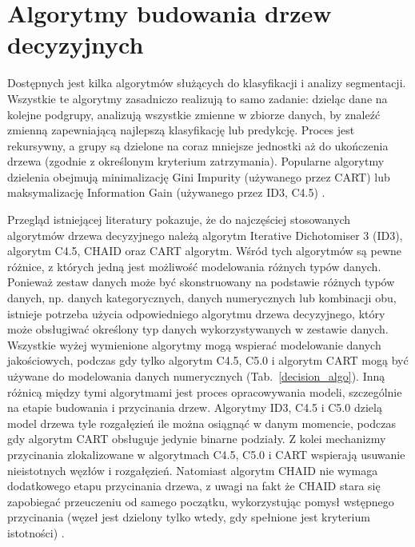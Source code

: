 \documentclass[10pt,a4paper]{article}
\begin{document}
\section{Algorytmy budowania drzew decyzyjnych}
Dostępnych jest kilka algorytmów służących do klasyfikacji i analizy segmentacji. Wszystkie te algorytmy zasadniczo realizują to samo zadanie: dzieląc dane na kolejne podgrupy, analizują wszystkie zmienne w zbiorze danych, by znaleźć zmienną zapewniającą najlepszą klasyfikację lub predykcję. Proces jest rekursywny, a grupy są dzielone na coraz mniejsze jednostki aż do ukończenia drzewa (zgodnie z określonym kryterium zatrzymania). Popularne algorytmy dzielenia obejmują minimalizację Gini Impurity (używanego przez CART) lub maksymalizację Information Gain (używanego przez ID3, C4.5) \cite{ WhatWhenWWW}.\par
\vskip 0.2in
Przegląd istniejącej literatury pokazuje, że do najczęściej stosowanych algorytmów drzewa decyzyjnego należą algorytm Iterative Dichotomiser 3 (ID3), algorytm C4.5, CHAID oraz CART algorytm. Wśród tych algorytmów są pewne różnice, z których jedną jest możliwość modelowania różnych typów danych. Ponieważ zestaw danych może być skonstruowany na podstawie różnych typów danych, np. danych kategorycznych, danych numerycznych lub kombinacji obu, istnieje potrzeba użycia odpowiedniego algorytmu drzewa decyzyjnego, który może obsługiwać określony typ danych wykorzystywanych w zestawie danych. Wszystkie wyżej wymienione algorytmy mogą wspierać modelowanie danych jakościowych, podczas gdy tylko algorytm C4.5, C5.0 i algorytm CART mogą być używane do modelowania danych numerycznych (Tab.~\ref{decision_algo}). Inną różnicą między tymi algorytmami jest proces opracowywania modeli, szczególnie na etapie budowania i przycinania drzew. Algorytmy ID3, C4.5 i C5.0 dzielą model drzewa tyle rozgałęzień ile można osiągnąć w danym momencie, podczas gdy algorytm CART obsługuje jedynie binarne podziały. Z kolei mechanizmy przycinania zlokalizowane w algorytmach C4.5, C5.0 i CART wspierają usuwanie nieistotnych węzłów i rozgałęzień. Natomiast algorytm CHAID nie wymaga dodatkowego etapu przycinania drzewa, z uwagi na fakt że CHAID stara się zapobiegać przeuczeniu od samego początku, wykorzystując pomysł wstępnego przycinania (węzeł jest dzielony tylko wtedy, gdy spełnione jest kryterium istotności) \cite{AnalyticsWWW, WhatWhenWWW}.
\end{document}
